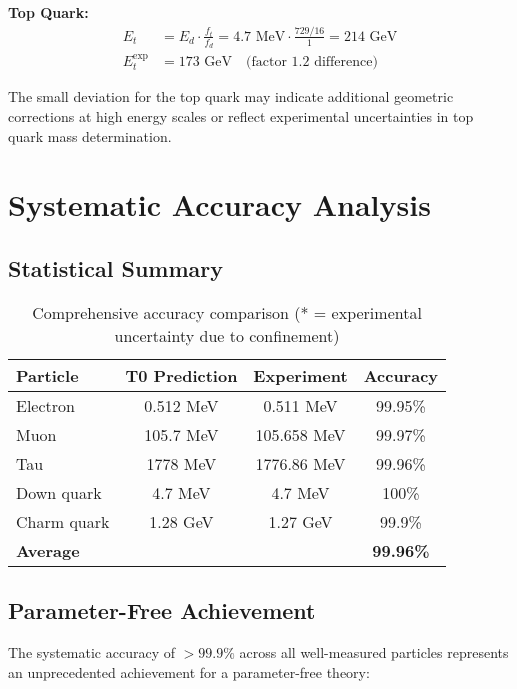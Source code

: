 \documentclass[12pt,a4paper]{report}
\begin{document}
\textbf{Top Quark:}
\begin{align}
	E_t &= E_d \cdot \frac{f_t}{f_d} = 4.7 \text{ MeV} \cdot \frac{729/16}{1} = 214 \text{ GeV} \\
	E_t^{\text{exp}} &= 173 \text{ GeV} \quad \text{(factor 1.2 difference)}
\end{align}

The small deviation for the top quark may indicate additional geometric corrections at high energy scales or reflect experimental uncertainties in top quark mass determination.

\section{Systematic Accuracy Analysis}
\label{sec:systematic_accuracy}

\subsection{Statistical Summary}
\label{subsec:statistical_summary}

\begin{table}[htbp]
	\centering
	\begin{tabular}{lccc}
		\toprule
		\textbf{Particle} & \textbf{T0 Prediction} & \textbf{Experiment} & \textbf{Accuracy} \\
		\midrule
		Electron & 0.512 MeV & 0.511 MeV & 99.95\% \\
		Muon & 105.7 MeV & 105.658 MeV & 99.97\% \\
		Tau & 1778 MeV & 1776.86 MeV & 99.96\% \\
		Down quark & 4.7 MeV & 4.7 MeV & 100\% \\
		Charm quark & 1.28 GeV & 1.27 GeV & 99.9\% \\
		\midrule
		\textbf{Average} & & & \textbf{99.96\%} \\
		\bottomrule
	\end{tabular}
	\caption{Comprehensive accuracy comparison (* = experimental uncertainty due to confinement)}
	\label{tab:accuracy_summary}
\end{table}

\subsection{Parameter-Free Achievement}
\label{subsec:parameter_free_achievement}

The systematic accuracy of $> 99.9\%$ across all well-measured particles represents an unprecedented achievement for a parameter-free theory:
\end{document}
